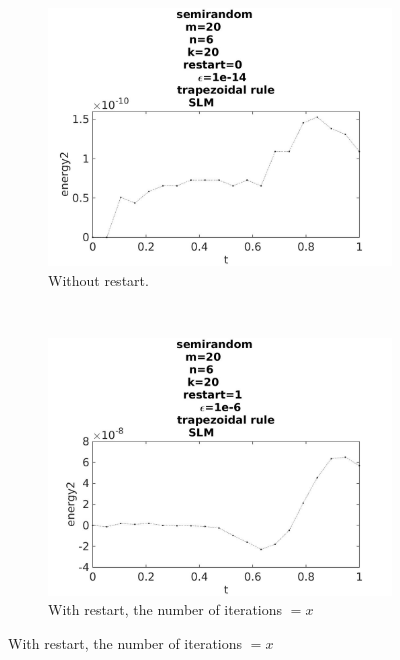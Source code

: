 \begin{figure}[H]
        \centering
        \begin{subfigure}[b]{0.3\textwidth}
                \includegraphics[width=\textwidth]{../MATLAB/fig/energytestrestart0.jpg}
                \caption{ Without restart. }
                \label{fig:energytestrestart0}
        \end{subfigure}
        ~
        \begin{subfigure}[b]{0.3\textwidth}
                \includegraphics[width=\textwidth]{../MATLAB/fig/energytestrestart2.jpg}
                \caption{ With restart, the number of iterations $= x$ }
                \label{fig:energytestrestart2}
        \end{subfigure}

\end{figure}
